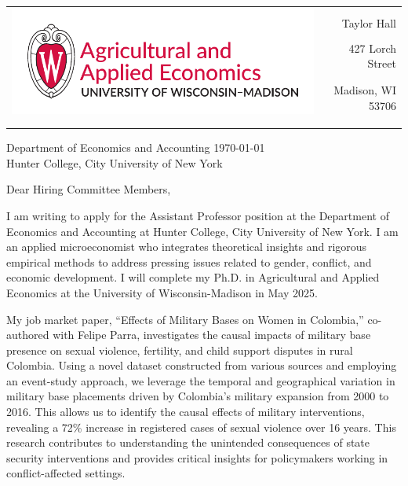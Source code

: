 \documentclass[12pt]{letter}
\begin{document}
\begin{tabularx}{\textwidth}{Xr}
\multirow{4}{*}{\includegraphics[height=3\baselineskip]{logo_cropped.pdf}} &  \\
& Taylor Hall \\
& 427 Lorch Street \\
& Madison, WI 53706 \\
[-1.8ex]\\
\\
\end{tabularx}

Department of Economics and Accounting \hfill \today \\
Hunter College, City University of New York
\medskip

Dear Hiring Committee Members,

I am writing to apply for the Assistant Professor position at the Department of Economics and Accounting at Hunter College, City University of New York. 
I am an applied microeconomist who integrates theoretical insights and rigorous empirical methods to address pressing issues related to gender, conflict, and economic development.
I will complete my Ph.D. in Agricultural and Applied Economics at the University of Wisconsin-Madison in May 2025. 

My job market paper, “Effects of Military Bases on Women in Colombia,” co-authored with Felipe Parra, investigates the causal impacts of military base presence 
on sexual violence, fertility, and child support disputes in rural Colombia. Using a novel dataset constructed from various sources and employing an event-study approach, 
we leverage the temporal and geographical variation in military base placements driven by Colombia's military expansion from 2000 to 2016. This allows us to identify 
the causal effects of military interventions, revealing a 72\% increase in registered cases of sexual violence over 16 years. 
This research contributes to understanding the unintended consequences of state security interventions and provides critical insights 
for policymakers working in conflict-affected settings.
\end{document}
